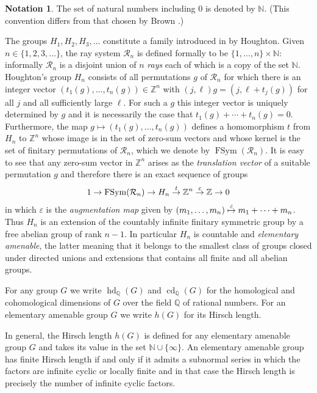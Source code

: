 \documentclass[11pt,a4paper]{amsart}
\renewcommand{\epsilon}{\varepsilon}
\theoremstyle{definition}
\newtheorem*{notation*}{Notation}
\theoremstyle{remark}
\newcommand{\cd}{\operatorname{cd}}
\newcommand{\hd}{\operatorname{hd}}
\newcommand{\FSym}{\operatorname{FSym}}
\newcommand{\Q}{\mathbb Q}
\newcommand{\Z}{\mathbb Z}
\newcommand{\N}{\mathbb N}
\newcommand{\Ra}{\mathcal{R}}
\begin{document}
\begin{notation*} The set of natural numbers including $0$ is denoted by $\N$. (This convention differs from that chosen by Brown \cite[\S5]{Brown}.) 
\end{notation*}
The groups $H_1, H_2, H_3, \ldots$ constitute a family introduced in \cite{MR521478} by Houghton. Given $n\in \{1, 2, 3, \ldots\}$, 
the ray system $\Ra_n$ is defined formally to be $\{1,\ldots,n\}\times \N$: informally $\Ra_n$ is a disjoint union of $n$ \emph{rays} each of which is a copy of the set $\N$. Houghton's group $H_n$ consists of all permutations $g$ of $\Ra_n$ for which there is an integer vector $(t_1(g),\ldots, t_n(g))\in\Z^n$ with $(j,\ell)g=(j,\ell+t_j(g))$ for all $j$ and all sufficiently large $\ell$. For such a $g$ this integer vector is uniquely determined by $g$ and it is necessarily the case that $t_1(g)+\cdots+t_n(g)=0$. Furthermore, the map $g\mapsto (t_1(g),\ldots, t_n(g))$ defines a homomorphism $t$ from $H_n$ to $\Z^n$ whose image is in the set of zero-sum vectors and whose kernel is the set of finitary permutations of $\Ra_n$, which we denote by $\FSym(\Ra_n)$. It is easy to see that any zero-sum vector in $\Z^n$ arises as the \emph{translation vector} of a suitable permutation $g$ and therefore there is an exact sequence of groups
$$1\to \FSym(\Ra_n)\to H_n\buildrel{t}\over\to \Z^n\buildrel\epsilon\over\to\Z\to 0$$ in which $\epsilon$ is the \emph{augmentation map} given by 
$(m_1,\ldots,m_n)\buildrel\epsilon\over\mapsto m_1+\cdots+m_n$.
Thus $H_n$ is an extension of the countably infinite finitary symmetric group by a free abelian group of rank $n-1$. In particular $H_n$ is countable and \emph{elementary amenable}, the latter meaning that it belongs to the smallest class of groups closed under directed unions and extensions that contains all finite and all abelian groups.

For any group $G$ we write $\hd_\Q(G)$ and $\cd_\Q(G)$ for the homological and cohomological dimensions of $G$ over the field $\Q$ of rational numbers. For an elementary amenable group $G$ we write $h(G)$ for its Hirsch length. 

  In general, the Hirsch length $h(G)$ is defined for any elementary amenable group $G$ and takes its value in the set $\N\cup\{\infty\}$. An elementary amenable group has finite Hirsch length if and only if it admits a subnormal series in which the factors are infinite cyclic or locally finite and in that case the Hirsch length is precisely the number of infinite cyclic factors.
\end{document}
